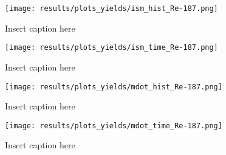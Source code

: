 \begin{figure}
  \centering
  \texttt{[image: results/plots\_yields/ism\_hist\_Re-187.png]}
  \caption{Insert caption here}
\end{figure}
\begin{figure}
  \centering
  \texttt{[image: results/plots\_yields/ism\_time\_Re-187.png]}
  \caption{Insert caption here}
\end{figure}
\begin{figure}
  \centering
  \texttt{[image: results/plots\_yields/mdot\_hist\_Re-187.png]}
  \caption{Insert caption here}
\end{figure}
\begin{figure}
  \centering
  \texttt{[image: results/plots\_yields/mdot\_time\_Re-187.png]}
  \caption{Insert caption here}
\end{figure}

\FloatBarrier
\begin{table}
  
\end{table}
\begin{table}

\end{table}
\begin{table}
  
\end{table}
\begin{table}
  
\end{table}
\begin{table}
  
\end{table}
\begin{table}
  
\end{table}
\begin{table}
  
\end{table}
\begin{table}
  
\end{table}

\FloatBarrier
